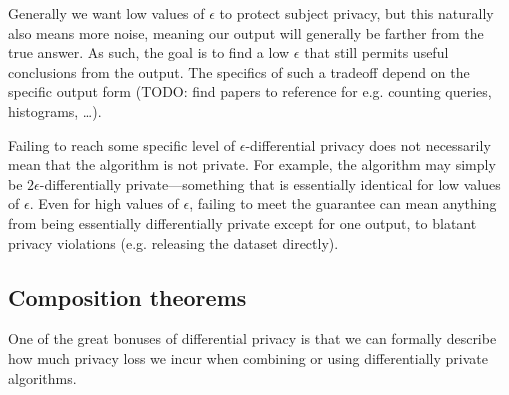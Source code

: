 \documentclass[12pt]{article}
\newcommand{\todo}[1]{{\color{red}#1}}
\begin{document}
\begin{description}
    Generally we want low values of $\epsilon$ to protect subject privacy, but this naturally also means more noise, meaning our output will generally be farther from the true answer. As such, the goal is to find a low $\epsilon$ that still permits useful conclusions from the output. The specifics of such a tradeoff depend on the specific output form (\todo{TODO: find papers to reference for e.g. counting queries, histograms, \dots}).
    
    Failing to reach some specific level of $\epsilon$-differential privacy does not necessarily mean that the algorithm is not private. For example, the algorithm may simply be $2\epsilon$-differentially private---something that is essentially identical for low values of $\epsilon$. Even for high values of $\epsilon$, failing to meet the guarantee can mean anything from being essentially differentially private except for one output, to blatant privacy violations (e.g. releasing the dataset directly).
\end{description}

\subsection{Composition theorems}

One of the great bonuses of differential privacy is that we can formally describe how much privacy loss we incur when combining or using differentially private algorithms.
\end{document}
